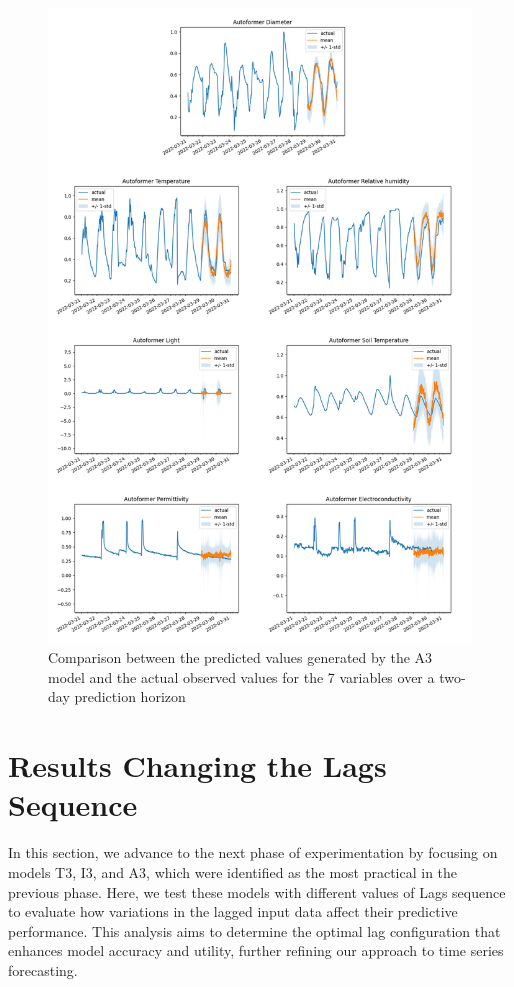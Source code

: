 \begin{figure}[htbp]
    \centering
    \includegraphics[width=15 cm]{6_ChapterResults/figuras/A3.png}
    \caption{Comparison between the predicted values generated by the A3 model and the actual observed values for the 7 variables over a two-day prediction horizon}
    \label{A3}
\end{figure}






\section{Results Changing the Lags Sequence}
In this section, we advance to the next phase of experimentation by focusing on models T3, I3, and A3, which were identified as the most practical in the previous phase. Here, we test these models with different values of Lags sequence to evaluate how variations in the lagged input data affect their predictive performance. This analysis aims to determine the optimal lag configuration that enhances model accuracy and utility, further refining our approach to time series forecasting.

